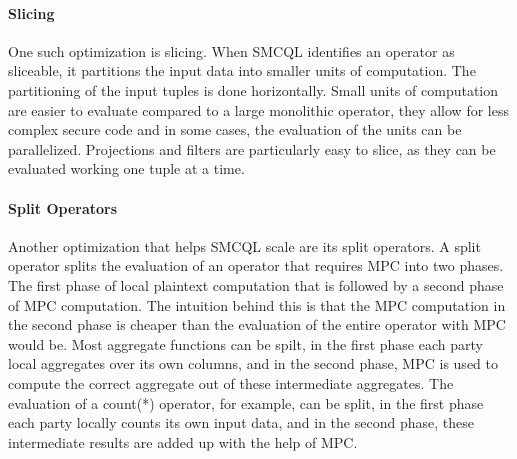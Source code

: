 \paragraph{Slicing}
One such optimization is slicing. When SMCQL identifies an operator as sliceable, it partitions the input data into smaller units of computation. The partitioning of the input tuples is done horizontally. Small units of computation are easier to evaluate compared to a large monolithic operator, they allow for less complex secure code and in some cases, the evaluation of the units can be parallelized. Projections and filters are particularly easy to slice, as they can be evaluated working one tuple at a time.
\paragraph{Split Operators} %
Another optimization that helps SMCQL scale are its split operators. A split operator splits the evaluation of an operator that requires MPC into two phases. The first phase of local plaintext computation that is followed by a second phase of MPC computation. The intuition behind this is that the MPC computation in the second phase is cheaper than the evaluation of the entire operator with MPC would be. Most aggregate functions can be spilt, in the first phase each party local aggregates over its own columns, and in the second phase, MPC is used to compute the correct aggregate out of these intermediate aggregates. The evaluation of a count(*) operator, for example, can be split, in the first phase each party locally counts its own input data, and in the second phase, these intermediate results are added up with the help of MPC. %



